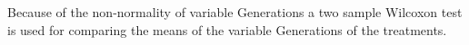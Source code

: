 \begin{frame}
 Because  of the non-normality of variable Generations 
a two sample Wilcoxon test is used for comparing the means 
of the variable Generations of the treatments.
 \end{frame}
